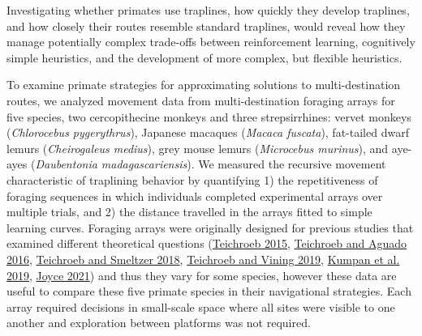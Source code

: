 \documentclass[twoside,12pt,final]{ucthesis-CA2012}
\begin{document}
\begin{ucmainmatter}
Investigating whether primates use traplines, how quickly they develop traplines, and how closely their routes resemble standard traplines, would reveal how they manage potentially complex trade-offs between reinforcement learning, cognitively simple heuristics, and the development of more complex, but flexible heuristics.

To examine primate strategies for approximating solutions to multi-destination routes, we analyzed movement data from multi-destination foraging arrays for five species, two cercopithecine monkeys and three strepsirrhines: vervet monkeys (\emph{Chlorocebus pygerythrus}), Japanese macaques (\emph{Macaca fuscata}), fat-tailed dwarf lemurs (\emph{Cheirogaleus medius}), grey mouse lemurs (\emph{Microcebus murinus}), and aye-ayes (\emph{Daubentonia madagascariensis}). We measured the recursive movement characteristic of traplining behavior by quantifying 1) the repetitiveness of foraging sequences in which individuals completed experimental arrays over multiple trials, and 2) the distance travelled in the arrays fitted to simple learning curves. Foraging arrays were originally designed for previous studies that examined different theoretical questions (\protect\hyperlink{ref-teichroeb2015}{Teichroeb 2015}, \protect\hyperlink{ref-teichroeb2016}{Teichroeb and Aguado 2016}, \protect\hyperlink{ref-teichroeb2018}{Teichroeb and Smeltzer 2018}, \protect\hyperlink{ref-teichroeb2019a}{Teichroeb and Vining 2019}, \protect\hyperlink{ref-kumpan2019}{Kumpan et al. 2019}, \protect\hyperlink{ref-joyce2021}{Joyce 2021}) and thus they vary for some species, however these data are useful to compare these five primate species in their navigational strategies. Each array required decisions in small-scale space where all sites were visible to one another and exploration between platforms was not required.


\end{ucmainmatter}
\end{document}
